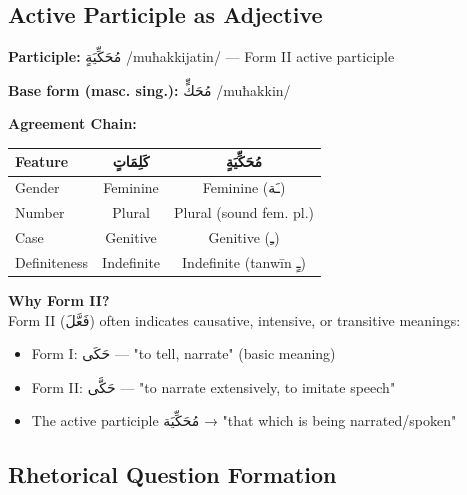 \documentclass[letterpaper,12pt]{article}
\begin{document}
\subsection{Active Participle as Adjective}

\begin{tcolorbox}[colback=white,colframe=accentcolor,breakable]
\textbf{Participle:} \textarabic{مُحَكِّيَةٍ} /muħakkijatin/ — Form II active participle

\textbf{Base form (masc. sing.):} \textarabic{مُحَكٍّ} /muħakkin/

\textbf{Agreement Chain:}
\begin{center}
\begin{tabular}{|l|c|c|}
\hline
\textbf{Feature} & \textbf{\textarabic{كَلِمَاتٍ}} & \textbf{\textarabic{مُحَكِّيَةٍ}} \\
\hline
Gender & Feminine & Feminine (\textarabic{ـَة}) \\
Number & Plural & Plural (sound fem. pl.) \\
Case & Genitive & Genitive (\textarabic{ـِ}) \\
Definiteness & Indefinite & Indefinite (tanwīn \textarabic{ـٍ}) \\
\hline
\end{tabular}
\end{center}

\textbf{Why Form II?}\\
Form II (\textarabic{فَعَّلَ}) often indicates causative, intensive, or transitive meanings:
\begin{itemize}
\item Form I: \textarabic{حَكَى} — "to tell, narrate" (basic meaning)
\item Form II: \textarabic{حَكَّى} — "to narrate extensively, to imitate speech"
\item The active participle \textarabic{مُحَكِّيَة} → "that which is being narrated/spoken"
\end{itemize}
\end{tcolorbox}

\subsection{Rhetorical Question Formation}
\end{document}
